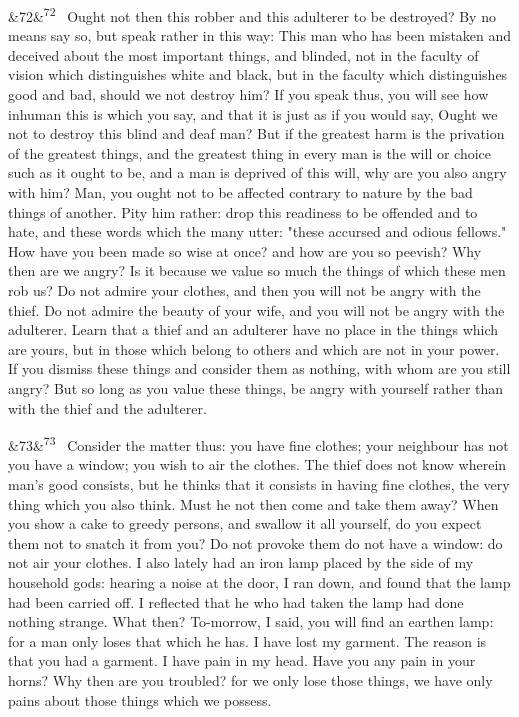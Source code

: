 \documentclass[12pt]{article}
\newcommand{\para}[1][]{\par\noindent\ifx&#1&\else\textsuperscript{\footnotesize #1}~\fi}
\begin{document}
\para[72] Ought not then this robber and this adulterer to be destroyed? By no means say so, but speak rather in this way: This man who has been mistaken and deceived about the most important things, and blinded, not in the faculty of vision which distinguishes white and black, but in the faculty which distinguishes good and bad, should we not destroy him? If you speak thus, you will see how inhuman this is which you say, and that it is just as if you would say, Ought we not to destroy this blind and deaf man? But if the greatest harm is the privation of the greatest things, and the greatest thing in every man is the will or choice such as it ought to be, and a man is deprived of this will, why are you also angry with him? Man, you ought not to be affected contrary to nature by the bad things of another. Pity him rather: drop this readiness to be offended and to hate, and these words which the many utter: "these accursed and odious fellows." How have you been made so wise at once? and how are you so peevish? Why then are we angry? Is it because we value so much the things of which these men rob us? Do not admire your clothes, and then you will not be angry with the thief. Do not admire the beauty of your wife, and you will not be angry with the adulterer. Learn that a thief and an adulterer have no place in the things which are yours, but in those which belong to others and which are not in your power. If you dismiss these things and consider them as nothing, with whom are you still angry? But so long as you value these things, be angry with yourself rather than with the thief and the adulterer.

\para[73] Consider the matter thus: you have fine clothes; your neighbour has not you have a window; you wish to air the clothes. The thief does not know wherein man's good consists, but he thinks that it consists in having fine clothes, the very thing which you also think. Must he not then come and take them away? When you show a cake to greedy persons, and swallow it all yourself, do you expect them not to snatch it from you? Do not provoke them do not have a window: do not air your clothes. I also lately had an iron lamp placed by the side of my household gods: hearing a noise at the door, I ran down, and found that the lamp had been carried off. I reflected that he who had taken the lamp had done nothing strange. What then? To-morrow, I said, you will find an earthen lamp: for a man only loses that which he has. I have lost my garment. The reason is that you had a garment. I have pain in my head. Have you any pain in your horns? Why then are you troubled? for we only lose those things, we have only pains about those things which we possess.
\end{document}
